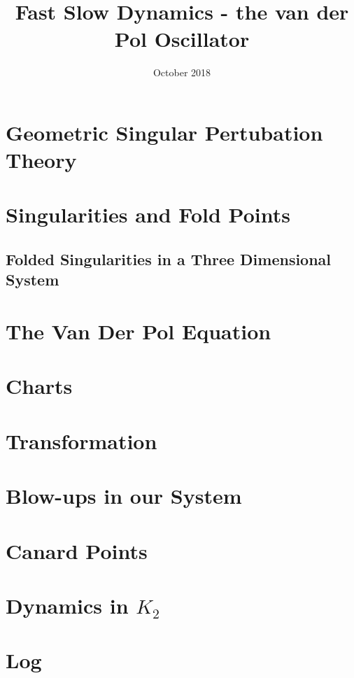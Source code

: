 \documentclass{article}
\title{Fast Slow Dynamics - the van der Pol Oscillator}
\author{}
\date{October 2018}
\begin{document}
\maketitle

\tableofcontents
\newpage
\listoffigures

\newpage
{} %
\pagestyle{fancy}

\begin{abstract}
	
\end{abstract}


\section{Geometric Singular Pertubation Theory} \label{GSPT}


\section{Singularities and Fold Points}\label{sec:singularitiesandfoldpoints}


\subsection{Folded Singularities in a Three Dimensional System}


\section{The Van Der Pol Equation}


\section{Charts}\label{sec: charts}



\section{Transformation}



\section{Blow-ups in our System}\label{sec: VDP Blowup}


\section{Canard Points}

\newpage
\appendix
\section{Dynamics in \texorpdfstring{$K_2$}{K2}}

\newpage


\nocite{strogatz2007nonlinear}
\appendix
\section{Log}
\end{document}
